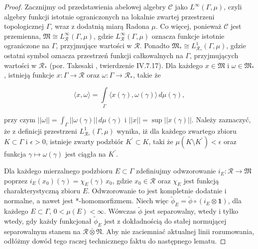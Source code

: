 \begin{proof}
Zacznijmy od przedstawienia abelowej algebry $\mathcal{C}$ jako
$L^{\infty}(\Gamma, \mu)$, czyli algebry funkcji istotnie ograniczonych
na lokalnie zwartej przestrzeni topologicznej $\Gamma$,
wraz z dodatnią miarą Radona $\mu$.
Co więcej, ponieważ $\mathcal{C}$ jest przemienna,
$\mathfrak{M} \cong L^{\infty}_{\mathcal{R}}(\Gamma, \mu)$,
gdzie $L^{\infty}_{\mathcal{R}}(\Gamma, \mu)$  oznacza
funkcje istotnie ograniczone na $\Gamma$, przyjmujące wartości w $\mathcal{R}$.
Ponadto $\mathfrak{M}_{*} \cong L^{1}_{\mathcal{R}_{*}}(\Gamma, \mu)$,
gdzie ostatni symbol oznacza
przestrzeń funkcji całkowalnych na $\Gamma$, przyjmujących wartości w $\mathcal{R}_{*}$
(por. Takesaki \cite{Takesaki1}, twierdzenie IV.7.17).
Dla każdego $x \in \mathfrak{M}$ i $\omega \in \mathfrak{M}_{*}$,
istnieją funkcje $x:\Gamma\to\mathcal{R}$ oraz
$\omega:\Gamma\to\mathcal{R}_{*}$, takie że
\begin{linenomath*}
 \begin{equation}
\langle x, \omega \rangle =\int \limits_{\Gamma}
\langle x(\gamma), \omega(\gamma) \rangle \, d \mu(\gamma),
 \end{equation}
\end{linenomath*}
przy czym $||\omega|| = \int_{\Gamma} ||\omega(\gamma)|| \, d \mu(\gamma)$
i $||x|| = \sup || x(\gamma) ||$.
Należy zaznaczyć, że z definicji przestrzeni $L^{1}_{\mathcal{R}_{*}}(\Gamma, \mu)$
wynika, iż dla każdego zwartego zbioru
$K \subset \Gamma$ i $\epsilon >0$,
istnieje zwarty podzbiór $K^{'} \subset K$,
taki że $\mu (K \setminus K^{'}) < \epsilon$
oraz funkcja $\gamma \mapsto \omega(\gamma)$ jest ciągła na $K^{'}$.

Dla każdego mierzalnego podzbioru $E \subset \Gamma$
zdefiniujmy odwzorowanie
$i_{E}: \mathcal{R} \rightarrow \mathfrak{M}$ poprzez
$i_{E}(x_{0})(\gamma) = \chi_{E}(\gamma) \, x_{0}$,
gdzie $x_{0} \in \mathcal{R}$
oraz $\chi_{E}$ jest funkcją charakterystyczną zbioru $E$.
Odwzorowanie to jest kompletnie dodatnie i normalne,
a nawet jest *-homomorfizmem.
Niech więc $\tilde{\phi}_{E} = \tilde{\phi} \circ (i_{E} \otimes \mathbf{1})$,
dla każdego $E \subset \Gamma$, $0<\mu(E)<\infty$.
Wówczas $\tilde{\phi}$ jest separowalny, wtedy i tylko wtedy, gdy
każdy funkcjonał $\tilde{\phi}_{E}$ jest z dokładnością do stałej
normującej separowalnym stanem na $\mathcal{R} \bar{\otimes} \mathfrak{N}$.
Aby nie zaciemniać aktualnej linii rozumowania,
odłóżmy dowód tego raczej technicznego faktu do następnego lematu.


\end{proof}
